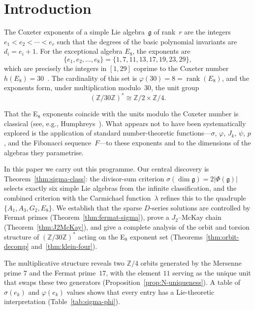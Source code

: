 \documentclass[11pt]{amsart}
\theoremstyle{plain}
\theoremstyle{definition}
\theoremstyle{remark}
\newcommand{\fg}{\mathfrak{g}}
\renewcommand{\Phi}{\varPhi}
\newcommand{\rank}{\operatorname{rank}}
\begin{document}
\section{Introduction}\label{sec:intro}

The Coxeter exponents of a simple Lie algebra~$\fg$ of rank~$r$ are the
integers $e_1 < e_2 < \cdots < e_r$ such that the degrees of the basic
polynomial invariants are $d_i = e_i + 1$.  For the exceptional algebra
$E_8$, the exponents are
\begin{equation}\label{eq:E8exp}
  \{e_1, e_2, \ldots, e_8\} = \{1, 7, 11, 13, 17, 19, 23, 29\},
\end{equation}
which are precisely the integers in $[1,29]$ coprime to the Coxeter
number $h(E_8) = 30$~\cite{Kostant1959}.  The cardinality of this set is
$\varphi(30) = 8 = \rank(E_8)$, and the exponents form, under
multiplication modulo~$30$, the unit group
\begin{equation}\label{eq:unitgroup}
  (\mathbb{Z}/30\mathbb{Z})^* \cong \mathbb{Z}/2 \times \mathbb{Z}/4.
\end{equation}

That the E$_8$ exponents coincide with the units modulo the Coxeter
number is classical (see, e.g., Humphreys~\cite{Humphreys1972}).
What appears not to have been systematically explored is the application
of standard number-theoretic functions---$\sigma$, $\varphi$, $J_k$,
$\psi$, $p$, and the Fibonacci sequence~$F$---to these exponents and to
the dimensions of the algebras they parametrise.

In this paper we carry out this programme.  Our central discovery is
Theorem~\ref{thm:sigma-class}: the divisor-sum criterion
$\sigma(\dim\fg) = 2|\Phi(\fg)|$ selects exactly six simple Lie
algebras from the infinite classification, and the combined criterion
with the Carmichael function~$\lambda$ refines this to the quadruple
$\{A_1, A_3, G_2, E_8\}$.  We establish that the sparse $D$-series solutions
are controlled by Fermat primes (Theorem~\ref{thm:fermat-sigma}), prove
a $J_2$--McKay chain (Theorem~\ref{thm:J2McKay}), and give a complete
analysis of the orbit and torsion structure of $(\mathbb{Z}/30\mathbb{Z})^*$
acting on the E$_8$ exponent set (Theorems~\ref{thm:orbit-decomp}
and~\ref{thm:klein-four}).

The multiplicative structure reveals two $\mathbb{Z}/4$ orbits generated
by the Mersenne prime $7$ and the Fermat prime~$17$, with the element
$11$ serving as the unique unit that swaps these two generators
(Proposition~\ref{prop:N-uniqueness}).  A table of
$\sigma(e_k)$ and $\varphi(e_k)$ values shows that every entry has a
Lie-theoretic interpretation (Table~\ref{tab:sigma-phi}).
\end{document}
